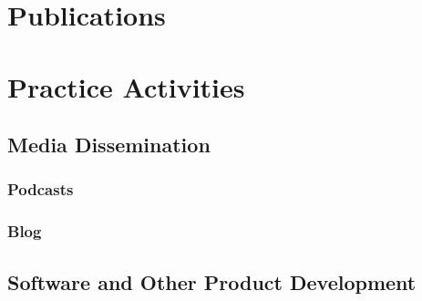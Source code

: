 \documentclass[11pt,a4paper]{moderncv}
\begin{document}



\section{Publications}

\begin{refsection}
\nocite{*}
\printbibliography[title={Peer-Reviewed Publications}, heading=subbibliography]
\end{refsection}

\begin{refsection}
\nocite{*}
\printbibliography[title={Books}, heading=subbibliography]
\end{refsection}

\begin{refsection}
\nocite{*}
\printbibliography[title={Chapters}, heading=subbibliography]
\end{refsection}





\section{Practice Activities}
\subsection{Media Dissemination}
\subsubsection{Podcasts}

\subsubsection{Blog}




\subsection{Software and Other Product Development}
\end{document}
